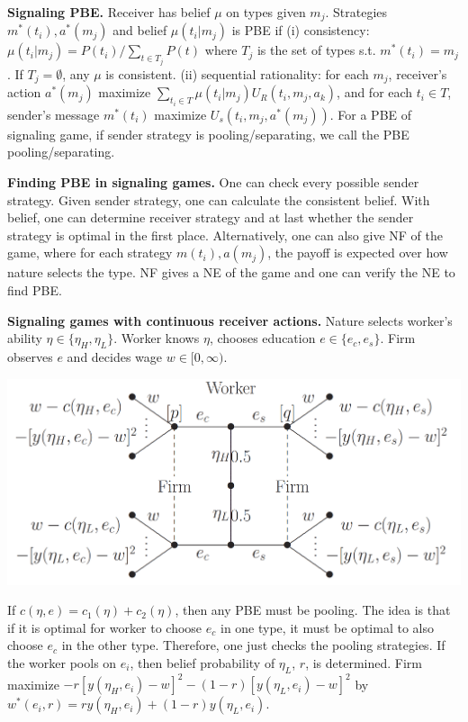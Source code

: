 \documentclass[a4paper,11pt,landscape]{article}
\begin{document}
\begin{multicols*}{3}
\textbf{Signaling PBE.} Receiver has belief $\mu$ on types given $m_j$. Strategies $m^*(t_i),a^*(m_j)$ and belief $\mu(t_i|m_j)$ is PBE if (i) consistency: $\mu(t_i|m_j)\allowbreak=P(t_i)/\sum_{t\in T_j} P(t)$ where $T_j$ is the set of types s.t. $m^*(t_i)=m_j$. If $T_j=\emptyset$, any $\mu$ is consistent. (ii) sequential rationality: for each $m_j$, receiver's action $a^*(m_j)$ maximize $\sum_{t_i\in T}\mu(t_i|m_j)U_R(t_i,m_j,a_k)$, and for each $t_i\in T$, sender's message $m^*(t_i)$ maximize $U_s(t_i,m_j,a^*(m_j))$.
For a PBE of signaling game, if sender strategy is pooling/separating, we call the PBE pooling/separating.

\textbf{Finding PBE in signaling games.} One can check every possible sender strategy. Given sender strategy, one can calculate the consistent belief. With belief, one can determine receiver strategy and at last whether the sender strategy is optimal in the first place. Alternatively, one can also give NF of the game, where for each strategy $m(t_i), a(m_j)$, the payoff is expected over how nature selects the type. NF gives a NE of the game and one can verify the NE to find PBE.

\textbf{Signaling games with continuous receiver actions.} Nature selects worker's ability $\eta\in\{\eta_H,\eta_L\}$. Worker knows $\eta$, chooses education $e\in\{e_c,e_s\}$. Firm observes $e$ and decides wage $w\in[0,\infty)$.

\begin{center}
    \includegraphics[width=\linewidth]{job_market_signaling.png}
\end{center}

If $c(\eta,e)=c_1(\eta)+c_2(\eta)$, then any PBE must be pooling. The idea is that if it is optimal for worker to choose $e_c$ in one type, it must be optimal to also choose $e_c$ in the other type. Therefore, one just checks the pooling strategies. If the worker pools on $e_i$, then belief probability of $\eta_L$, $r$, is determined. Firm maximize $-r[y(\eta_H,e_i)-w]^2-(1-r)\allowbreak[y(\eta_L,e_i)-w]^2$ by $w^*(e_i,r)=ry(\eta_H,e_i)+(1-r)y(\eta_L,e_i)$.


\end{multicols*}
\end{document}
